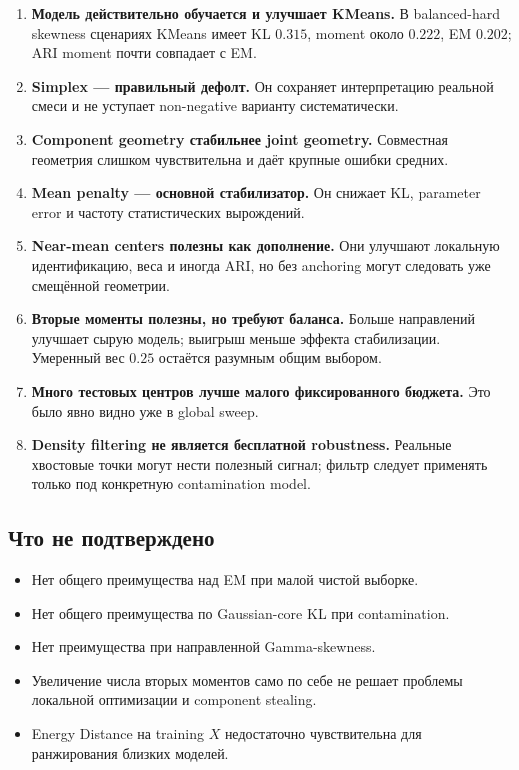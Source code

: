 \documentclass[11pt,a4paper]{article}
\begin{document}
\begin{enumerate}
  \item \textbf{Модель действительно обучается и улучшает KMeans.}
        В balanced-hard skewness сценариях KMeans имеет KL $0.315$, moment
        около $0.222$, EM $0.202$; ARI moment почти совпадает с EM.
  \item \textbf{Simplex --- правильный дефолт.}
        Он сохраняет интерпретацию реальной смеси и не уступает
        non-negative варианту систематически.
  \item \textbf{Component geometry стабильнее joint geometry.}
        Совместная геометрия слишком чувствительна и даёт крупные ошибки
        средних.
  \item \textbf{Mean penalty --- основной стабилизатор.}
        Он снижает KL, parameter error и частоту статистических вырождений.
  \item \textbf{Near-mean centers полезны как дополнение.}
        Они улучшают локальную идентификацию, веса и иногда ARI, но без
        anchoring могут следовать уже смещённой геометрии.
  \item \textbf{Вторые моменты полезны, но требуют баланса.}
        Больше направлений улучшает сырую модель; выигрыш меньше эффекта
        стабилизации. Умеренный вес $0.25$ остаётся разумным общим выбором.
  \item \textbf{Много тестовых центров лучше малого фиксированного бюджета.}
        Это было явно видно уже в global sweep.
  \item \textbf{Density filtering не является бесплатной robustness.}
        Реальные хвостовые точки могут нести полезный сигнал; фильтр следует
        применять только под конкретную contamination model.
\end{enumerate}

\subsection{Что не подтверждено}

\begin{itemize}
  \item Нет общего преимущества над EM при малой чистой выборке.
  \item Нет общего преимущества по Gaussian-core KL при contamination.
  \item Нет преимущества при направленной Gamma-skewness.
  \item Увеличение числа вторых моментов само по себе не решает проблемы
        локальной оптимизации и component stealing.
  \item Energy Distance на training $X$ недостаточно чувствительна для
        ранжирования близких моделей.
\end{itemize}
\end{document}
